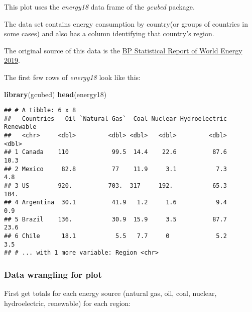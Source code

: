 \documentclass[]{book}
\newenvironment{Shaded}{\begin{snugshade}}{\end{snugshade}}
\newcommand{\KeywordTok}[1]{\textcolor[rgb]{0.13,0.29,0.53}{\textbf{#1}}}
\newcommand{\NormalTok}[1]{#1}
\begin{document}
This plot uses the \emph{energy18} data frame of the \emph{gcubed} package.

The data set contains energy consumption by country(or groups of countries in some cases) and also has a column identifying that country's region.

The original source of this data is the \href{https://www.bp.com/content/dam/bp/business-sites/en/global/corporate/pdfs/energy-economics/statistical-review/bp-stats-review-2019-full-report.pdf}{BP Statistical Report of World Energy 2019}.

The first few rows of \emph{energy18} look like this:

\begin{Shaded}
\begin{Highlighting}[]
\KeywordTok{library}\NormalTok{(gcubed)}
\KeywordTok{head}\NormalTok{(energy18)}
\end{Highlighting}
\end{Shaded}

\begin{verbatim}
## # A tibble: 6 x 8
##   Countries   Oil `Natural Gas`  Coal Nuclear Hydroelectric Renewable
##   <chr>     <dbl>         <dbl> <dbl>   <dbl>         <dbl>     <dbl>
## 1 Canada    110            99.5  14.4    22.6          87.6      10.3
## 2 Mexico     82.8          77    11.9     3.1           7.3       4.8
## 3 US        920.          703.  317     192.           65.3     104. 
## 4 Argentina  30.1          41.9   1.2     1.6           9.4       0.9
## 5 Brazil    136.           30.9  15.9     3.5          87.7      23.6
## 6 Chile      18.1           5.5   7.7     0             5.2       3.5
## # ... with 1 more variable: Region <chr>
\end{verbatim}

\hypertarget{energywrangle}{%
\subsubsection*{Data wrangling for plot}\label{energywrangle}}

First get totals for each energy source (natural gas, oil, coal, nuclear, hydroelectric, renewable) for each region:
\end{document}
